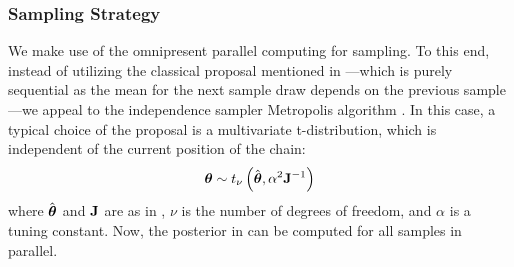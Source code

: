 \subsubsection{Sampling Strategy} 
We make use of the omnipresent parallel computing for sampling. To this end, instead of utilizing the classical proposal mentioned in ---which is purely sequential as the mean for the next sample draw depends on the previous sample---we appeal to the independence sampler Metropolis algorithm \cite{gelman2004}. In this case, a typical choice of the proposal is a multivariate t-distribution, which is independent of the current position of the chain:
\begin{equation} \elabel{proposal}
  \vparam \sim \studentst{\nu}{\hat{\vparam}}{\alpha^2 \mOI^{-1}}
\end{equation}
where $\hat{{\boldsymbol\theta}}$ and $\mathbf{J}$ are as in , $\nu$ is the number of degrees of freedom, and $\alpha$ is a tuning constant. Now, the posterior in  can be computed for all samples in parallel.
